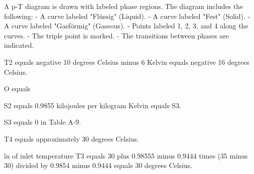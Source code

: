 A p-T diagram is drawn with labeled phase regions. The diagram includes the following:  
- A curve labeled "Flüssig" (Liquid).  
- A curve labeled "Fest" (Solid).  
- A curve labeled "Gasförmig" (Gaseous).  
- Points labeled 1, 2, 3, and 4 along the curves.  
- The triple point is marked.  
- The transitions between phases are indicated.

T2 equals negative 10 degrees Celsius minus 6 Kelvin equals negative 16 degrees Celsius.  

O equals  

S2 equals 0.9855 kilojoules per kilogram Kelvin equals S3.  

S3 equals 0 in Table A-9.  

T4 equals approximately 30 degrees Celsius.  

ln of inlet temperature T3 equals 30 plus 0.98555 minus 0.9444 times (35 minus 30) divided by 0.9854 minus 0.9444 equals 30 degrees Celsius.